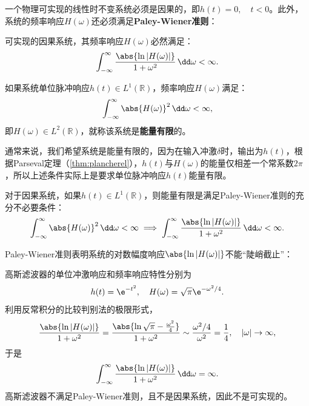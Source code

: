 一个物理可实现的线性时不变系统必须是因果的，即$h(t)=0,\quad t<0$。此外，系统的频率响应$H(\omega)$还必须满足\textbf{Paley-Wiener准则}\cite{signal_systems}：
\begin{definition}\label{def:paley_winner}
    可实现的因果系统，其频率响应$H(\omega)$必然满足：
    \begin{equation}
        \int_{-\infty}^{\infty}\frac{\abs{\ln|H(\omega)|}}{1+\omega^2}\,\dd\omega<\infty.
    \end{equation}
\end{definition}
\begin{definition}[能量有限系统]
    如果系统单位脉冲响应$h(t)\in L^1(\mathbb{R})$，频率响应$H(\omega)$满足：
    \begin{equation}
        \int_{-\infty}^{\infty}\abs{H(\omega)}^2\,\dd\omega<\infty,
    \end{equation}
    即$H(\omega)\in L^2(\mathbb{R})$，就称该系统是\textbf{能量有限}的。
\end{definition}
通常来说，我们希望系统是能量有限的，因为在输入冲激$\delta$时，输出为$h(t)$，根据Parseval定理（\cref{thm:plancherel}），$h(t)$与$H(\omega)$的能量仅相差一个常系数$2\pi$，所以上述条件实际上是要求单位脉冲响应$h(t)$能量有限。
\begin{claim}
    对于因果系统，如果$h(t)\in L^1(\mathbb{R})$，则能量有限是满足Paley-Wiener准则的充分不必要条件：
    \begin{equation}
        \int_{-\infty}^{\infty}\abs{H(\omega)}^2\,\dd\omega<\infty\implies\int_{-\infty}^{\infty}\frac{\abs{\ln|H(\omega)|}}{1+\omega^2}\,\dd\omega<\infty.
    \end{equation}
\end{claim}

Paley-Wiener准则表明系统的对数幅度响应$\abs{\ln|H(\omega)|}$不能“陡峭截止”：
\begin{example}
    高斯滤波器的单位冲激响应和频率响应特性分别为
    \begin{equation}
        h(t)=\e^{-t^2},\quad H(\omega)=\sqrt{\pi}\e^{-\omega^2/4}.
    \end{equation}
    利用反常积分的比较判别法的极限形式，
    \begin{equation}
        \frac{\abs{\ln|H(\omega)|}}{1+\omega^2}=\frac{\abs{\ln \sqrt{\pi}-\frac{\omega^2}{4}}}{1+\omega^2}\sim \frac{\omega^2/4}{\omega^2}=\frac{1}{4},\quad |\omega|\to\infty,
    \end{equation}
    于是
    \begin{equation}
        \int_{-\infty}^{\infty}\frac{\abs{\ln|H(\omega)|}}{1+\omega^2}\,\dd\omega=\infty.
    \end{equation}
    高斯滤波器不满足Paley-Wiener准则，且不是因果系统，因此不是可实现的。
\end{example}

